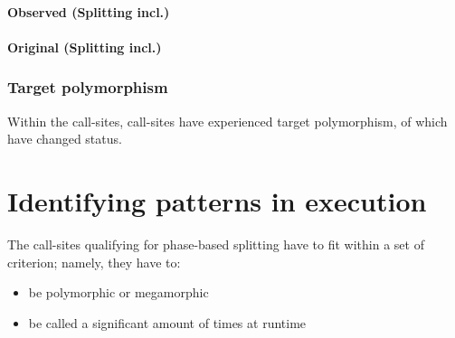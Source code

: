 \documentclass[preprint]{acmart}
\begin{document}
\paragraph{Observed (Splitting incl.)} 
\CacheDistribObservedSplitting
 

\paragraph{Original (Splitting incl.)} 
\CacheDistribOriginalSplitting


\subsubsection{Target polymorphism}

Within the \NumberCallSitesSplitting call-sites, \HasExperiencedTP call-sites have experienced target polymorphism, of which \HasChangedStatus have changed status.

\TargetPolymorphism

\TargetPolymorphismDetails

%
%



\section{Identifying patterns in execution}

The call-sites qualifying for phase-based splitting have to fit within a set of criterion; namely, they have to:
 \begin{itemize}
 \item be polymorphic or megamorphic
 \item be called a significant amount of times at runtime
 \end{itemize}
\end{document}
